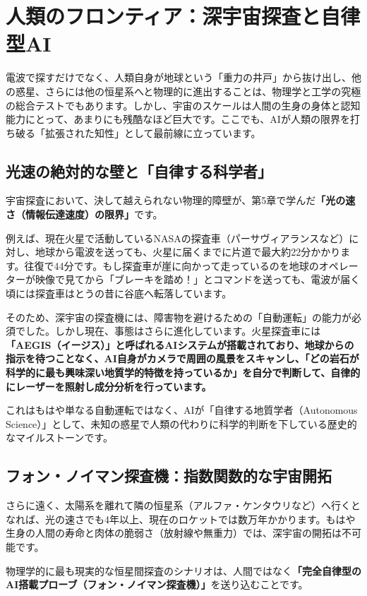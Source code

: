 \section{人類のフロンティア：深宇宙探査と自律型AI}

電波で探すだけでなく、人類自身が地球という「重力の井戸」から抜け出し、他の惑星、さらには他の恒星系へと物理的に進出することは、物理学と工学の究極の総合テストでもあります。しかし、宇宙のスケールは人間の生身の身体と認知能力にとって、あまりにも残酷なほど巨大です。ここでも、AIが人類の限界を打ち破る「拡張された知性」として最前線に立っています。

\subsection{光速の絶対的な壁と「自律する科学者」}

宇宙探査において、決して越えられない物理的障壁が、第5章で学んだ\textbf{「光の速さ（情報伝達速度）の限界」}です。

例えば、現在火星で活動しているNASAの探査車（パーサヴィアランスなど）に対し、地球から電波を送っても、火星に届くまでに片道で最大約22分かかります。往復で44分です。もし探査車が崖に向かって走っているのを地球のオペレーターが映像で見てから「ブレーキを踏め！」とコマンドを送っても、電波が届く頃には探査車はとうの昔に谷底へ転落しています。

そのため、深宇宙の探査機には、障害物を避けるための「自動運転」の能力が必須でした。しかし現在、事態はさらに進化しています。火星探査車には\textbf{「AEGIS（イージス）」と呼ばれるAIシステムが搭載されており、地球からの指示を待つことなく、AI自身がカメラで周囲の風景をスキャンし、「どの岩石が科学的に最も興味深い地質学的特徴を持っているか」を自分で判断して、自律的にレーザーを照射し成分分析を行っています。}

これはもはや単なる自動運転ではなく、AIが「自律する地質学者（Autonomous Science）」として、未知の惑星で人類の代わりに科学的判断を下している歴史的なマイルストーンです。

\subsection{フォン・ノイマン探査機：指数関数的な宇宙開拓}

さらに遠く、太陽系を離れて隣の恒星系（アルファ・ケンタウリなど）へ行くとなれば、光の速さでも4年以上、現在のロケットでは数万年かかります。もはや生身の人間の寿命と肉体の脆弱さ（放射線や無重力）では、深宇宙の開拓は不可能です。

物理学的に最も現実的な恒星間探査のシナリオは、人間ではなく\textbf{「完全自律型のAI搭載プローブ（フォン・ノイマン探査機）」}を送り込むことです。

